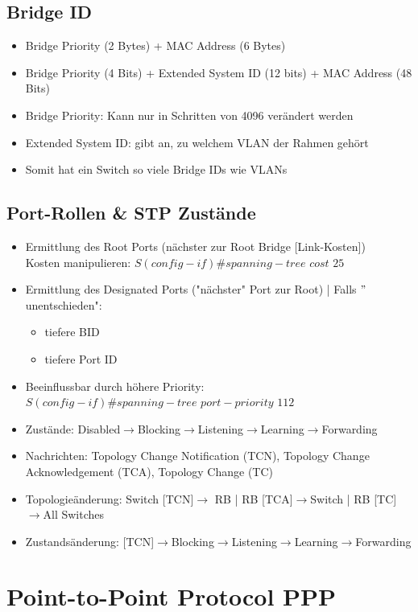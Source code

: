 \documentclass[landscape,twocolumn,a4paper]{article}
\newcommand{\ra}{\rightarrow}
\begin{document}
\begin{footnotesize}
\subsection{Bridge ID}
\begin{itemize}
	\item Bridge Priority (2 Bytes) + MAC Address (6 Bytes)
	\item Bridge Priority (4 Bits) + Extended System ID (12 bits) + MAC Address (48 Bits)
	\item Bridge Priority: Kann nur in Schritten von 4096 verändert werden
	\item Extended System ID: gibt an, zu welchem VLAN der Rahmen gehört
	\item Somit hat ein Switch so viele Bridge IDs wie VLANs
\end{itemize}

\subsection{Port-Rollen \& STP Zustände}
\begin{itemize}
	\item Ermittlung des Root Ports (nächster zur Root Bridge [Link-Kosten])\\
	Kosten manipulieren: $S(config-if)\#spanning-tree$ $cost$ $25$
	\item Ermittlung des Designated Ports ("nächster" Port zur Root) | Falls $"$unentschieden":
	\begin{itemize}
		\item tiefere BID
		\item tiefere Port ID
	\end{itemize}
	\item Beeinflussbar durch höhere Priority:\\
	$S(config-if)\#spanning-tree$ $port-priority$ $112$
	\item Zustände: Disabled$\ra$Blocking$\ra$Listening$\ra$Learning$\ra$Forwarding
	\item Nachrichten: Topology Change Notification (TCN), Topology Change Acknowledgement (TCA), Topology Change (TC)
	\item Topologieänderung: Switch [TCN]$\ra$ RB | RB [TCA]$\ra$Switch | RB [TC]$\ra$All Switches
	\item Zustandsänderung: [TCN]$\ra$Blocking$\ra$Listening$\ra$Learning$\ra$Forwarding
\end{itemize}

\section{Point-to-Point Protocol PPP}

\end{footnotesize}
\end{document}
